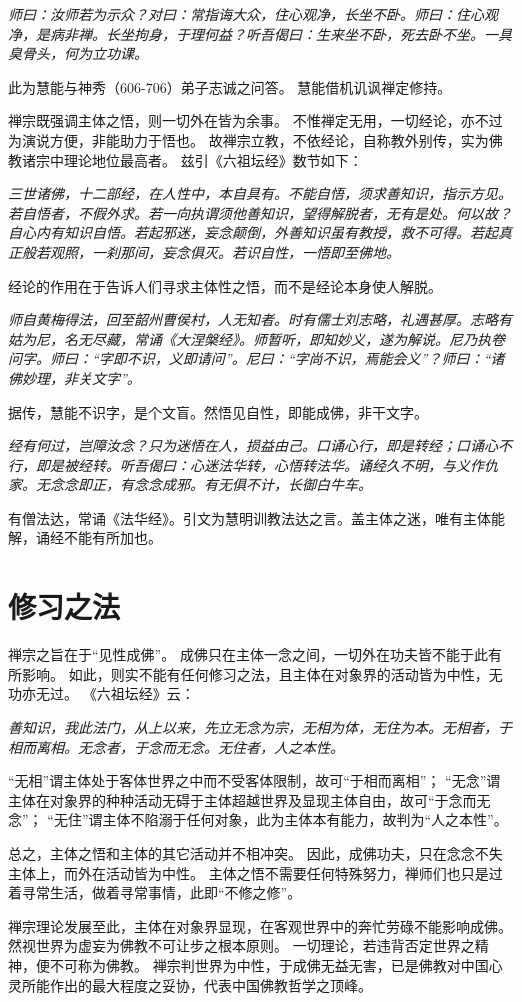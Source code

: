 \documentclass[11pt]{article}
\begin{document}
\textit{师曰：汝师若为示众？对曰：常指诲大众，住心观净，长坐不卧。师曰：住心观净，是病非禅。长坐拘身，于理何益？听吾偈曰：生来坐不卧，死去卧不坐。一具臭骨头，何为立功课。}

此为慧能与神秀（606-706）弟子志诚之问答。
慧能借机讥讽禅定修持。

\newline

禅宗既强调主体之悟，则一切外在皆为余事。
不惟禅定无用，一切经论，亦不过为演说方便，非能助力于悟也。
故禅宗立教，不依经论，自称教外别传，实为佛教诸宗中理论地位最高者。
兹引《六祖坛经》数节如下：

\textit{三世诸佛，十二部经，在人性中，本自具有。不能自悟，须求善知识，指示方见。若自悟者，不假外求。若一向执谓须他善知识，望得解脱者，无有是处。何以故？自心内有知识自悟。若起邪迷，妄念颠倒，外善知识虽有教授，救不可得。若起真正般若观照，一刹那间，妄念俱灭。若识自性，一悟即至佛地。}

经论的作用在于告诉人们寻求主体性之悟，而不是经论本身使人解脱。

\textit{师自黄梅得法，回至韶州曹侯村，人无知者。时有儒士刘志略，礼遇甚厚。志略有姑为尼，名无尽藏，常诵《大涅槃经》。师暂听，即知妙义，遂为解说。尼乃执卷问字。师曰：“字即不识，义即请问”。尼曰：“字尚不识，焉能会义”？师曰：“诸佛妙理，非关文字”。}

据传，慧能不识字，是个文盲。然悟见自性，即能成佛，非干文字。

\textit{经有何过，岂障汝念？只为迷悟在人，损益由己。口诵心行，即是转经；口诵心不行，即是被经转。听吾偈曰：心迷法华转，心悟转法华。诵经久不明，与义作仇家。无念念即正，有念念成邪。有无俱不计，长御白牛车。}

有僧法达，常诵《法华经》。引文为慧明训教法达之言。盖主体之迷，唯有主体能解，诵经不能有所加也。

\section{修习之法}
禅宗之旨在于“见性成佛”。
成佛只在主体一念之间，一切外在功夫皆不能于此有所影响。
如此，则实不能有任何修习之法，且主体在对象界的活动皆为中性，无功亦无过。
《六祖坛经》云：

\textit{善知识，我此法门，从上以来，先立无念为宗，无相为体，无住为本。无相者，于相而离相。无念者，于念而无念。无住者，人之本性。}

“无相”谓主体处于客体世界之中而不受客体限制，故可“于相而离相”；
“无念”谓主体在对象界的种种活动无碍于主体超越世界及显现主体自由，故可“于念而无念”；
“无住”谓主体不陷溺于任何对象，此为主体本有能力，故判为“人之本性”。

\newline

总之，主体之悟和主体的其它活动并不相冲突。
因此，成佛功夫，只在念念不失主体上，而外在活动皆为中性。
主体之悟不需要任何特殊努力，禅师们也只是过着寻常生活，做着寻常事情，此即“不修之修”。

\newline

禅宗理论发展至此，主体在对象界显现，在客观世界中的奔忙劳碌不能影响成佛。
然视世界为虚妄为佛教不可让步之根本原则。
一切理论，若违背否定世界之精神，便不可称为佛教。
禅宗判世界为中性，于成佛无益无害，已是佛教对中国心灵所能作出的最大程度之妥协，代表中国佛教哲学之顶峰。
  
\end{document}
